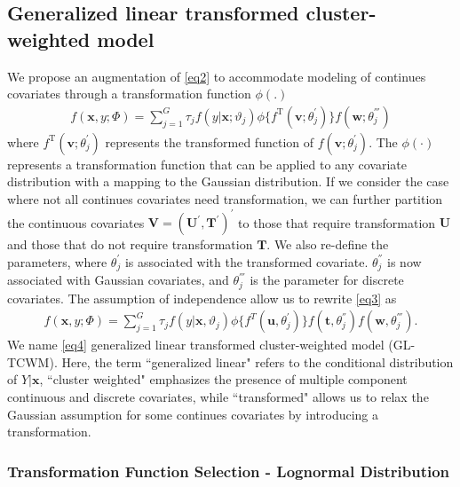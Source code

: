 \documentclass[11pt,letterpaper]{article}
\numberwithin{equation}{section}
\numberwithin{equation}{section}
\numberwithin{equation}{section}
\begin{document}
\subsection{Generalized linear transformed cluster-weighted model }
We propose an augmentation of \eqref{eq2} to accommodate modeling of continues covariates through a transformation function $\phi(.)$
\begin{align}
 f(\bm x, y; \Phi)= \sum_{j=1}^{G} \tau_j f(y|\bm{x};\vartheta_j)\phi\{f^{\text{T}}(\bm{v};\theta_{j}^{'})\}f(\bm{w};\theta_{j}^{'''})
\label{eq3}
\end{align}
where $f^{\text{T}}(\bm{v};\theta_j^{'})$ represents the transformed function of $f(\bm{v};\theta_j^{'})$. The $\phi(\cdot)$ represents a transformation function that can be applied to any covariate distribution with a mapping to the Gaussian distribution. If we consider the case where not all continues covariates need transformation, we can further partition the continuous covariates $\bm V=(\bm U^{'}, \bm T^{'})^{'}$ to those that require transformation $\bm{U}$ and those that do not require transformation $\bm{T}$. We also re-define the parameters, where $\theta_j^{'}$ is associated with the transformed covariate. $\theta_j^{''}$ is now associated with Gaussian covariates, and $\theta_j^{'''}$ is the parameter for discrete covariates.  The assumption of independence allow us to rewrite \eqref{eq3} as
\begin{align}
 f(\bm x, y; \Phi)= \sum_{j=1}^{G} \tau_j f(y|\bm{x},\vartheta_j)\phi\{f^{T}(\bm{u},\theta_j^{'})\}f(\bm{t},\theta_j^{''})f(\bm{w},\theta_j^{'''}).
\label{eq4}
\end{align}
We name \eqref{eq4} generalized linear transformed cluster-weighted model (GL-TCWM). Here, the term ``generalized linear" refers to the conditional distribution of $Y|\bm{x}$, ``cluster weighted" emphasizes the presence of multiple component continuous and discrete  covariates, while ``transformed" allows us to relax the Gaussian assumption for some continues covariates by introducing a transformation.


\subsubsection{Transformation Function Selection - Lognormal Distribution}
\end{document}
